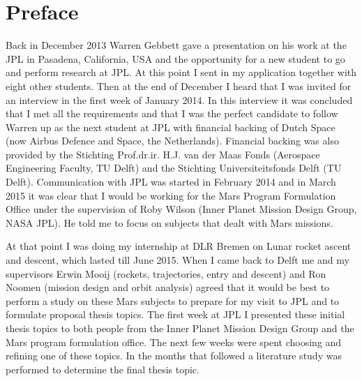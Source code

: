 \chapter*{Preface} 

Back in December 2013 Warren Gebbett gave a presentation on his work at the \ac{JPL} in Pasadena, California, USA and the opportunity for a new student to go and perform research at \ac{JPL}. At this point I sent in my application together with eight other students.  Then at the end of December I heard that I was invited for an interview in the first week of January 2014. In this interview it was concluded that I met all the requirements and that I was the perfect candidate to follow Warren up as the next student at \ac{JPL} with financial backing of Dutch Space (now Airbus Defence and Space, the Netherlands). Financial backing was also provided by the Stichting Prof.dr.ir. H.J. van der Maas Fonds (Aerospace Engineering Faculty, TU Delft) and the Stichting Universiteitsfonds Delft (TU Delft). Communication with \ac{JPL} was started in February 2014 and in March 2015 it was clear that I would be working for the Mars Program Formulation Office under the supervision of Roby Wilson (Inner Planet Mission Design Group, \ac{NASA} \ac{JPL}). He told me to focus on subjects that dealt with Mars missions. 

At that point I was doing my internship at DLR Bremen on Lunar rocket ascent and descent, which lasted till June 2015. When I came back to Delft me and my supervisors Erwin Mooij (rockets, trajectories, entry and descent) and Ron Noomen (mission design and orbit analysis) agreed that it would be best to perform a study on these Mars subjects to prepare for my visit to \ac{JPL} and to formulate proposal thesis topics. The first week at \ac{JPL} I presented these initial thesis topics to both people from the Inner Planet Mission Design Group and the Mars program formulation office. The next few weeks were spent choosing and refining one of these topics. In the months that followed a literature study was performed to determine the final thesis topic. 

